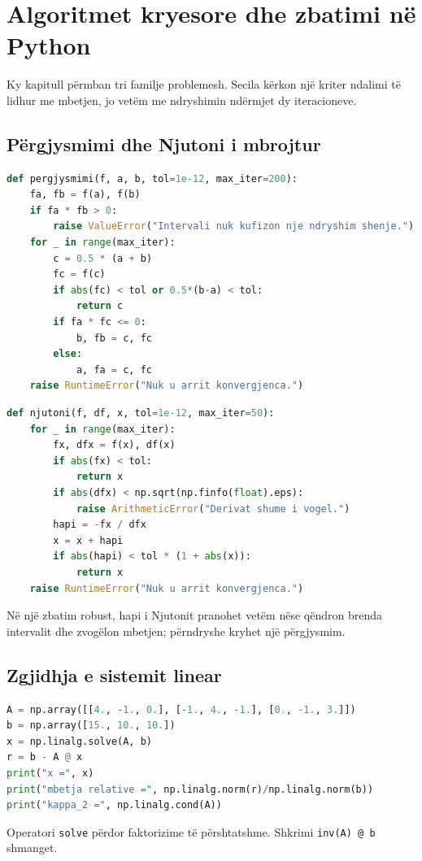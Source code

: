 \section{Algoritmet kryesore dhe zbatimi në Python}
Ky kapitull përmban tri familje problemesh. Secila kërkon një kriter ndalimi të lidhur me mbetjen, jo vetëm me ndryshimin ndërmjet dy iteracioneve.

\subsection{Përgjysmimi dhe Njutoni i mbrojtur}
\begin{lstlisting}[language=Python,caption={Përgjysmimi me kontroll të intervalit.}]
def pergjysmimi(f, a, b, tol=1e-12, max_iter=200):
    fa, fb = f(a), f(b)
    if fa * fb > 0:
        raise ValueError("Intervali nuk kufizon nje ndryshim shenje.")
    for _ in range(max_iter):
        c = 0.5 * (a + b)
        fc = f(c)
        if abs(fc) < tol or 0.5*(b-a) < tol:
            return c
        if fa * fc <= 0:
            b, fb = c, fc
        else:
            a, fa = c, fc
    raise RuntimeError("Nuk u arrit konvergjenca.")
\end{lstlisting}

\begin{lstlisting}[language=Python,caption={Njutoni me kontroll të derivatit.}]
def njutoni(f, df, x, tol=1e-12, max_iter=50):
    for _ in range(max_iter):
        fx, dfx = f(x), df(x)
        if abs(fx) < tol:
            return x
        if abs(dfx) < np.sqrt(np.finfo(float).eps):
            raise ArithmeticError("Derivat shume i vogel.")
        hapi = -fx / dfx
        x = x + hapi
        if abs(hapi) < tol * (1 + abs(x)):
            return x
    raise RuntimeError("Nuk u arrit konvergjenca.")
\end{lstlisting}
Në një zbatim robust, hapi i Njutonit pranohet vetëm nëse qëndron brenda intervalit dhe zvogëlon mbetjen; përndryshe kryhet një përgjysmim.

\subsection{Zgjidhja e sistemit linear}
\begin{lstlisting}[language=Python,caption={Zgjidhja dhe diagnostika pa formuar inversin.}]
A = np.array([[4., -1., 0.], [-1., 4., -1.], [0., -1., 3.]])
b = np.array([15., 10., 10.])
x = np.linalg.solve(A, b)
r = b - A @ x
print("x =", x)
print("mbetja relative =", np.linalg.norm(r)/np.linalg.norm(b))
print("kappa_2 =", np.linalg.cond(A))
\end{lstlisting}
Operatori \texttt{solve} përdor faktorizime të përshtatshme. Shkrimi \texttt{inv(A) @ b} shmanget.

